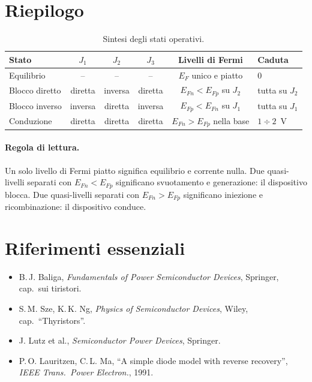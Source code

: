 \section{Riepilogo}

\begin{table}[h]
\centering
\small
\begin{tabular}{@{}lccccl@{}}
\toprule
Stato & $J_1$ & $J_2$ & $J_3$ & Livelli di Fermi & Caduta \\
\midrule
Equilibrio        & --      & --      & --      & $E_F$ unico e piatto & $0$ \\
Blocco diretto    & diretta & inversa & diretta & $E_{Fn}<E_{Fp}$ su $J_2$ & tutta su $J_2$ \\
Blocco inverso    & inversa & diretta & inversa & $E_{Fp}<E_{Fn}$ su $J_1$ & tutta su $J_1$ \\
Conduzione        & diretta & diretta & diretta & $E_{Fn}>E_{Fp}$ nella base & $1\div2$~V \\
\bottomrule
\end{tabular}
\caption{Sintesi degli stati operativi.}
\end{table}

\paragraph{Regola di lettura.} Un solo livello di Fermi piatto significa equilibrio
e corrente nulla. Due quasi-livelli separati con $E_{Fn}<E_{Fp}$ significano
svuotamento e generazione: il dispositivo blocca. Due quasi-livelli separati con
$E_{Fn}>E_{Fp}$ significano iniezione e ricombinazione: il dispositivo conduce.

\section*{Riferimenti essenziali}
\begin{itemize}\itemsep1pt
  \item B.\,J. Baliga, \emph{Fundamentals of Power Semiconductor Devices},
        Springer, cap.\ sui tiristori.
  \item S.\,M. Sze, K.\,K. Ng, \emph{Physics of Semiconductor Devices},
        Wiley, cap.\ ``Thyristors''.
  \item J. Lutz et al., \emph{Semiconductor Power Devices}, Springer.
  \item P.\,O. Lauritzen, C.\,L. Ma, ``A simple diode model with reverse recovery'',
        \emph{IEEE Trans.\ Power Electron.}, 1991.
\end{itemize}

